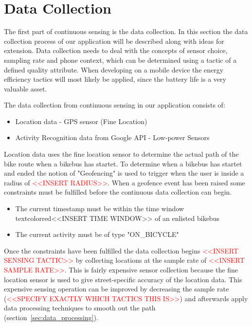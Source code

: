 


\section{Data Collection}
\label{sec:data_collection}

The first part of continuous sensing is the data collection. In this section the data collection process of our application will be described along with ideas for extension.
Data collection needs to deal with the concepts of sensor choice, sampling rate and phone context, which can be determined using a tactic of a defined quality attribute. When developing on a mobile device the energy efficiency tactics will most likely be applied, since the battery life is a very valuable asset.  

The data collection from continuous sensing in our application consists of: 
\begin{itemize}
    \item Location data - GPS sensor (Fine Location)
    \item Activity Recognition data from Google API - Low-power Sensors \cite{androidActivity}
\end{itemize}

Location data uses the fine location sensor to determine the actual path of the bike route when a bikebus has startet. To determine when a bikebus has startet and ended the notion of "Geofencing" is used to trigger when the user is inside a radius of \textcolor{red}{<<INSERT RADIUS>>}. 
When a geofence event has been raised some constraints must be fulfilled before the continuous data collection can begin.
\begin{itemize}
    \item The current timestamp must be within the time window textcolor{red}{<<INSERT TIME WINDOW>>} of an enlisted bikebus
    \item The current activity must be of type "ON\_BICYCLE"
\end{itemize}
Once the constraints have been fulfilled the data collection begins \textcolor{red}{<<INSERT SENSING TACTIC>>} by collecting locations at the sample rate of \textcolor{red}{<<INSERT SAMPLE RATE>>}. This is fairly expensive sensor collection because the fine location sensor is used to give street-specific accuracy of the location data. This expensive sensing operation can be improved by decreasing the sample rate (\textcolor{red}{<<SPECIFY EXACTLY WHICH TACTICS THIS IS>>}) and afterwards apply data processing techniques to smooth out the path (section~\ref{sec:data_processing}).

